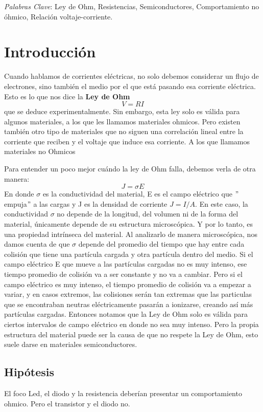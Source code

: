 \documentclass[article,12pt]{elsarticle}
\begin{document}
\noindent \textit{Palabras Clave}: Ley de Ohm, Resistencias, Semiconductores, Comportamiento no óhmico, Relación voltaje-corriente.\\ \hline

\section{Introducción}
Cuando hablamos de corrientes eléctricas, no solo debemos considerar un flujo de electrones, sino también el medio por el que está pasando esa corriente eléctrica. Esto es lo que nos dice la \textbf{Ley de Ohm}
\begin{equation}
    V=RI
\end{equation}
que se deduce experimentalmente.
Sin embargo, esta ley solo es válida para algunos materiales, a los que les llamamos materiales ohmicos. Pero existen también otro tipo de materiales que no siguen una correlación lineal entre la corriente que reciben y el voltaje que induce esa corriente. A los que llamamos materiales no Ohmicos

Para entender un poco mejor cuándo la ley de Ohm falla, debemos verla de otra manera:
\begin{equation}
    J= \sigma E
\end{equation}
En donde $\sigma$ es la conductividad del material, E es el campo eléctrico que $"$empuja$"$ a las cargas y J es la densidad de corriente $J=I/A$.
En este caso, la conductividad $\sigma$ no depende de la longitud, del volumen ni de la forma del material, únicamente depende de su estructura microscópica. Y por lo tanto, es una propiedad intrínseca del material. Al analizarlo de manera microscópica, nos damos cuenta de que $\sigma$ depende del promedio del tiempo que hay entre cada colisión que tiene una partícula cargada y otra partícula dentro del medio. Si el campo eléctrico E que mueve a las partículas cargadas no es muy intenso, ese tiempo promedio de colisión va a ser constante y no va a cambiar. Pero si el campo eléctrico es muy intenso, el tiempo promedio de colisión va a empezar a variar, y en casos extremos, las colisiones serán tan extremas que las particulas que se encontraban neutras eléctricamente pasarán a ionizarse, creando así más partículas cargadas.
Entonces notamos que la Ley de Ohm solo es válida para ciertos intervalos de campo eléctrico en donde no sea muy intenso.
Pero la propia estructura del material puede ser la causa de que no respete la Ley de Ohm, esto suele darse en materiales semiconductores.
    \subsection{Hipótesis}
    El foco Led, el diodo y la resistencia deberían presentar un comportamiento ohmico. Pero el transistor y el diodo no.
\end{document}
